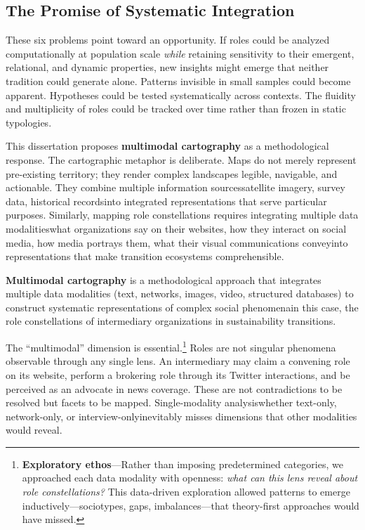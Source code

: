 \documentclass[../main.tex]{subfiles}
\begin{document}
\subsection{The Promise of Systematic Integration}

These six problems point toward an opportunity. If roles could be analyzed computationally at population scale \emph{while} retaining sensitivity to their emergent, relational, and dynamic properties, new insights might emerge that neither tradition could generate alone. Patterns invisible in small samples could become apparent. Hypotheses could be tested systematically across contexts. The fluidity and multiplicity of roles could be tracked over time rather than frozen in static typologies.

This dissertation proposes \textbf{multimodal cartography} as a methodological response. The cartographic metaphor is deliberate. Maps do not merely represent pre-existing territory; they render complex landscapes legible, navigable, and actionable. They combine multiple information sources\textemdash satellite imagery, survey data, historical records\textemdash into integrated representations that serve particular purposes. Similarly, mapping role constellations requires integrating multiple data modalities\textemdash what organizations say on their websites, how they interact on social media, how media portrays them, what their visual communications convey\textemdash into representations that make transition ecosystems comprehensible.

\begin{roledef}
\textbf{Multimodal cartography} is a methodological approach that integrates multiple data modalities (text, networks, images, video, structured databases) to construct systematic representations of complex social phenomena\textemdash in this case, the role constellations of intermediary organizations in sustainability transitions.
\end{roledef}

The ``multimodal'' dimension is essential.\footnote{\textbf{Exploratory ethos}---Rather than imposing predetermined categories, we approached each data modality with openness: \emph{what can this lens reveal about role constellations?} This data-driven exploration allowed patterns to emerge inductively---sociotypes, gaps, imbalances---that theory-first approaches would have missed.} Roles are not singular phenomena observable through any single lens. An intermediary may claim a convening role on its website, perform a brokering role through its Twitter interactions, and be perceived as an advocate in news coverage. These are not contradictions to be resolved but facets to be mapped. Single-modality analysis\textemdash whether text-only, network-only, or interview-only\textemdash inevitably misses dimensions that other modalities would reveal.
\end{document}

